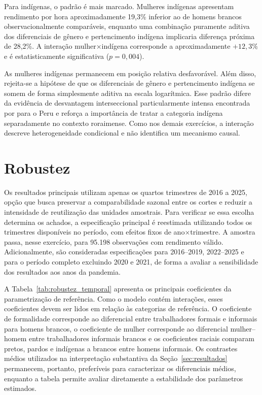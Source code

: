 \documentclass[12pt]{article}
\begin{document}
Para indígenas, o padrão é mais marcado. Mulheres indígenas apresentam
rendimento por hora aproximadamente 19,3\% inferior ao de homens brancos
observacionalmente comparáveis, enquanto uma combinação puramente aditiva dos
diferenciais de gênero e pertencimento indígena implicaria diferença próxima
de 28,2\%. A interação mulher$\times$indígena corresponde a aproximadamente
$+12,3\%$ e é estatisticamente significativa ($p=0,004$).

As mulheres indígenas permanecem em posição relativa desfavorável. Além disso, 
rejeita-se a hipótese de que os diferenciais de gênero e pertencimento indígena 
se somem de forma simplesmente aditiva na escala logarítmica. Esse padrão difere 
da evidência de desvantagem
interseccional particularmente intensa encontrada por \citet{kolev2015}
para o Peru e reforça a importância de tratar a categoria indígena
separadamente no contexto roraimense. Como nos demais exercícios, a interação
descreve heterogeneidade condicional e não identifica um mecanismo causal.

\section{Robustez}
\label{sec:robustez}

Os resultados principais utilizam apenas os quartos trimestres de 2016 a 2025,
opção que busca preservar a comparabilidade sazonal entre os cortes e reduzir
a intensidade de reutilização das unidades amostrais. Para verificar se essa
escolha determina os achados, a especificação principal é reestimada utilizando
todos os trimestres disponíveis no período, com efeitos fixos de
ano$\times$trimestre. A amostra passa, nesse exercício, para 95.198
observações com rendimento válido. Adicionalmente, são consideradas
especificações para 2016--2019, 2022--2025 e para o período completo excluindo
2020 e 2021, de forma a avaliar a sensibilidade dos resultados aos anos da
pandemia.

A Tabela~\ref{tab:robustez_temporal} apresenta os principais coeficientes da
parametrização de referência. Como o modelo contém interações, esses
coeficientes devem ser lidos em relação às categorias de referência. O
coeficiente de formalidade corresponde ao diferencial entre trabalhadores
formais e informais para homens brancos, o coeficiente de mulher corresponde
ao diferencial mulher--homem entre trabalhadores informais brancos e os
coeficientes raciais comparam pretos, pardos e indígenas a brancos entre
homens informais. Os contrastes médios utilizados na interpretação substantiva
da Seção~\ref{sec:resultados} permanecem, portanto, preferíveis para caracterizar
os diferenciais médios, enquanto a tabela permite avaliar diretamente a
estabilidade dos parâmetros estimados.
\end{document}
